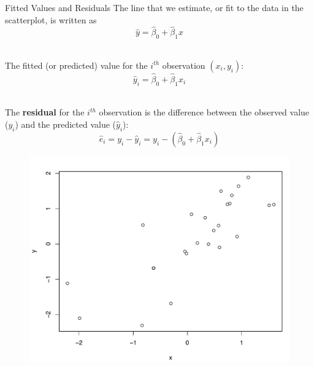 \documentclass[10pt]{beamer}
\begin{document}
\begin{frame}{Fitted Values and Residuals}
The line that we estimate, or fit to the data in the scatterplot, is written as
$$\hat{y} = \hat{\beta}_0 + \hat{\beta}_1 x$$\\
\vspace{10pt}

The fitted (or predicted) value for the $i^{th}$ observation $(x_i, y_i)$:
$$\hat{y}_i = \hat{\beta}_0 + \hat{\beta}_1 x_i$$\\
\vspace{10pt}

The \textbf{residual} for the $i^{th}$ observation is the difference between the observed value ($y_i$) and the predicted value ($\hat{y}_i$):\\
$$\hat{e}_i = y_i - \hat{y}_i = y_i - (\hat{\beta}_0 + \hat{\beta}_1 x_i)$$
\end{frame}

\begin{frame}
\begin{figure}
\includegraphics[scale=0.5]{figure/scatter1_2.pdf}
\end{figure}
\end{frame}
\end{document}
